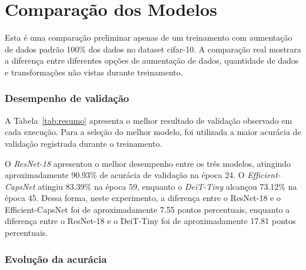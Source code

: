 
\chapter{Comparação dos Modelos}
Esta é uma comparação preliminar apenas de um treinamento com aumentação de dados padrão 100\% dos dados no dataset cifar-10. A comparação real mostrara a diferença entre diferentes opções de aumentação de dados, quantidade de dados e transformações não vistas durante treinamento.

\subsection{Desempenho de validação}
A Tabela~\ref{tab:resumo} apresenta o melhor resultado de validação observado em cada execução. Para a seleção do melhor modelo, foi utilizada a maior acurácia de validação registrada durante o treinamento.

\begin{table}[H]
\centering
\caption{Resumo dos melhores resultados observados nos registros de treinamento.}
\label{tab:resumo}
\end{table}

O \textit{ResNet-18} apresentou o melhor desempenho entre os três modelos, atingindo aproximadamente 90.93\% de acurácia de validação na época 24. O \textit{Efficient-CapsNet} atingiu 83.39\% na época 59, enquanto o \textit{DeiT-Tiny} alcançou 73.12\% na época 45. Dessa forma, neste experimento, a diferença entre o ResNet-18 e o Efficient-CapsNet foi de aproximadamente 7.55 pontos percentuais, enquanto a diferença entre o ResNet-18 e o DeiT-Tiny foi de aproximadamente 17.81 pontos percentuais.

\subsection{Evolução da acurácia}

